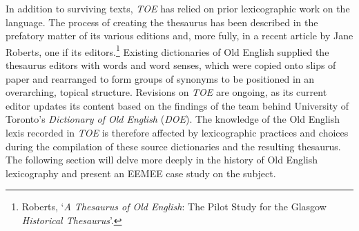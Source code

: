 In addition to surviving texts, \textit{TOE} has relied on prior lexicographic work on the language. 
The process of creating the thesaurus has been described in the prefatory matter of its various editions and, more fully, in a recent article by Jane Roberts, one if its editors.\footnote{Roberts, `\textit{A Thesaurus of Old English}: The Pilot Study for the Glasgow \textit{Historical Thesaurus}'.} %
Existing dictionaries of Old English supplied the thesaurus editors with words and word senses, which were copied onto slips of paper and rearranged to form groups of synonyms to be positioned in an overarching, topical structure. Revisions on \textit{TOE} are ongoing, as its current editor updates its content based on the findings of the team behind University of Toronto's \textit{Dictionary of Old English} (\textit{DOE}). The knowledge of the Old English lexis recorded in \textit{TOE} is therefore affected by lexicographic practices and choices during the compilation of these source dictionaries and the resulting thesaurus. The following section will delve more deeply in the history of Old English lexicography and present an EEMEE case study on the subject. %


